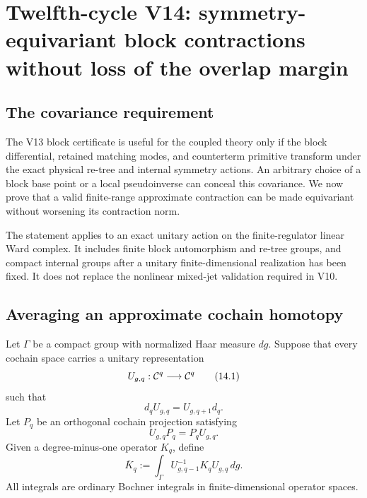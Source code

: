 \documentclass[11pt]{article}
\theoremstyle{remark}
\begin{document}
\section{Twelfth-cycle V14: symmetry-equivariant block contractions
without loss of the overlap margin}
\label{sec:v12v14}

\subsection{The covariance requirement}

The V13 block certificate is useful for the coupled theory only if
the block differential, retained matching modes, and counterterm
primitive transform under the exact physical re-tree and internal
symmetry actions.  An arbitrary choice of a block base point or a
local pseudoinverse can conceal this covariance.  We now prove that
a valid finite-range approximate contraction can be made equivariant
without worsening its contraction norm.

The statement applies to an exact unitary action on the
finite-regulator linear Ward complex.  It includes finite block
automorphism and re-tree groups, and compact internal groups after a
unitary finite-dimensional realization has been fixed.  It does not
replace the nonlinear mixed-jet validation required in V10.

\subsection{Averaging an approximate cochain homotopy}

Let \(\Gamma\) be a compact group with normalized Haar measure
\(dg\).  Suppose that every cochain space carries a unitary
representation
\[
                 U_{g,q}:{\cal C}^q\longrightarrow{\cal C}^q
                                                               \tag{14.1}
\]
such that
\[
             d_qU_{g,q}=U_{g,q+1}d_q.                       \tag{14.2}
\]
Let \(P_q\) be an orthogonal cochain projection satisfying
\[
                 U_{g,q}P_q=P_qU_{g,q}.                    \tag{14.3}
\]
Given a degree-minus-one operator \(K_q\), define
\[
 \overline K_q
 :=
 \int_\Gamma
 U_{g,q-1}^{-1}K_qU_{g,q}\,dg.                             \tag{14.4}
\]
All integrals are ordinary Bochner integrals in finite-dimensional
operator spaces.
\end{document}
